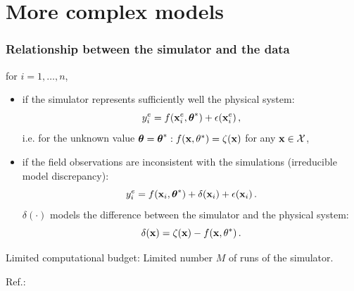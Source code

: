 \documentclass[nopagenumber,9pt]{beamer}
\begin{document}
 \section{More complex models}

\begin{frame}
 \frametitle{Relationship between the simulator and the data}

 for $i=1,\ldots, n$,
\begin{itemize}
 \item if the simulator  represents sufficiently well the physical system:
 \begin{equation*}
  \label{nodisc}
 y^{e}_i=f(\mathbf{x}^e_i,\boldsymbol{\theta}^*)+\epsilon(\mathbf{x}^e_i)\,,
 \end{equation*}
 i.e. for the unknown value $\boldsymbol{\theta}=\boldsymbol{\theta}^*: f(\mathbf{x},\theta^*)=\zeta(\mathbf{x}) $ for any $\mathbf{x}\in \mathcal{X}$,

 \item if the field observations are inconsistent with the simulations (irreducible model discrepancy):
 \begin{equation*}
  \label{disc}
 y^{e}_i=f(\mathbf{x}_i,\boldsymbol{\theta}^*)+\delta(\mathbf{x}_i) +\epsilon(\mathbf{x}_i)\,.
 \end{equation*}
 $\delta(\cdot)$ models the difference between the simulator and the physical system:
 $$\delta(\mathbf{x})=\zeta(\mathbf{x})-f(\mathbf{x},\theta^*) \,.$$
\end{itemize}

 
\bigskip

\begin{beamerboxesrounded}{Limited computational budget:}
 Limited number $M$ of runs of the simulator.
\end{beamerboxesrounded}

 

 Ref.:
\cite{kennedy2001,higdon2004}
 \end{frame}




%  
\end{document}
